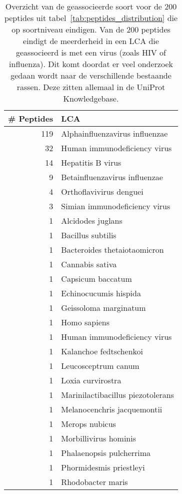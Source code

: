 \begin{table}[h!]
    \centering
    \begin{tabular}{|r|l|}
        \hline
        \textbf{\# Peptides} & \textbf{LCA} \\ \hline
        119 & Alphainfluenzavirus influenzae \\ \hline
        32 & Human immunodeficiency virus \\ \hline
        14 & Hepatitis B virus \\ \hline
        9 & Betainfluenzavirus influenzae \\ \hline
        4 & Orthoflavivirus denguei \\ \hline
        3 & Simian immunodeficiency virus \\ \hline
        1 & Alcidodes juglans \\ \hline
        1 & Bacillus subtilis \\ \hline
        1 & Bacteroides thetaiotaomicron \\ \hline
        1 & Cannabis sativa \\ \hline
        1 & Capsicum baccatum \\ \hline
        1 & Echinocucumis hispida \\ \hline
        1 & Geissoloma marginatum \\ \hline
        1 & Homo sapiens \\ \hline
        1 & Human immunodeficiency virus \\ \hline
        1 & Kalanchoe fedtschenkoi \\ \hline
        1 & Leucosceptrum canum \\ \hline
        1 & Loxia curvirostra \\ \hline
        1 & Marinilactibacillus piezotolerans \\ \hline
        1 & Melanocenchris jacquemontii \\ \hline
        1 & Merops nubicus \\ \hline
        1 & Morbillivirus hominis \\ \hline
        1 & Phalaenopsis pulcherrima \\ \hline
        1 & Phormidesmis priestleyi \\ \hline
        1 & Rhodobacter maris \\ \hline
    \end{tabular}
    \caption{Overzicht van de geassocieerde soort voor de 200 peptides uit tabel~\ref{tab:peptides_distribution} die op soortniveau eindigen.
    Van de 200 peptides eindigt de meerderheid in een LCA die geassocieerd is met een virus (zoals HIV of influenza). Dit komt doordat er veel onderzoek gedaan wordt naar de verschillende bestaande rassen. Deze zitten allemaal in de UniProt Knowledgebase.}
    \label{tab:peptides_species}
\end{table}
